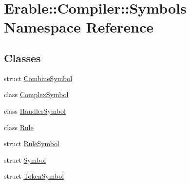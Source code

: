 \hypertarget{namespace_erable_1_1_compiler_1_1_symbols}{}\section{Erable\+::Compiler\+::Symbols Namespace Reference}
\label{namespace_erable_1_1_compiler_1_1_symbols}
\subsection*{Classes}
\begin{DoxyCompactItemize}
\item 
struct \mbox{\hyperlink{struct_erable_1_1_compiler_1_1_symbols_1_1_combine_symbol}{Combine\+Symbol}}
\item 
class \mbox{\hyperlink{class_erable_1_1_compiler_1_1_symbols_1_1_complex_symbol}{Complex\+Symbol}}
\item 
class \mbox{\hyperlink{class_erable_1_1_compiler_1_1_symbols_1_1_handler_symbol}{Handler\+Symbol}}
\item 
class \mbox{\hyperlink{class_erable_1_1_compiler_1_1_symbols_1_1_rule}{Rule}}
\item 
struct \mbox{\hyperlink{class_erable_1_1_compiler_1_1_symbols_1_1_rule_symbol}{Rule\+Symbol}}
\item 
struct \mbox{\hyperlink{class_erable_1_1_compiler_1_1_symbols_1_1_symbol}{Symbol}}
\item 
struct \mbox{\hyperlink{class_erable_1_1_compiler_1_1_symbols_1_1_token_symbol}{Token\+Symbol}}
\end{DoxyCompactItemize}
